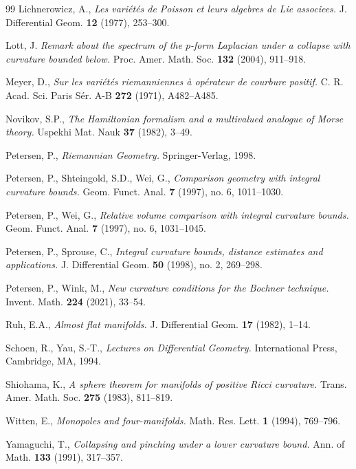 \documentclass[12pt, twoside]{article}
\theoremstyle{definition}
\numberwithin{equation}{section}
\begin{document}
\begin{thebibliography}{99}
		Lichnerowicz, A., \emph{Les variétés de Poisson et leurs algebres de Lie associees.} J. Differential Geom. \textbf{12} (1977), 253--300.
		
		Lott, J. \emph{Remark about the spectrum of the $p$-form Laplacian under a collapse with curvature bounded below.} Proc. Amer. Math. Soc. \textbf{132} (2004), 911--918.
		
		Meyer, D., \emph{Sur les variétés riemanniennes à opérateur de courbure positif.} C. R. Acad. Sci. Paris Sér. A-B \textbf{272} (1971), A482--A485.
		
		 Novikov, S.P., \emph{The Hamiltonian formalism and a multivalued analogue of Morse theory.} Uspekhi Mat. Nauk \textbf{37} (1982), 3--49.
		
		Petersen, P., \emph{Riemannian Geometry.} Springer-Verlag, 1998.
		
		Petersen, P., Shteingold, S.D.,  Wei, G.,  \emph{Comparison geometry with integral curvature bounds.} Geom. Funct. Anal. \textbf{7} (1997), no. 6, 1011--1030.
		
		Petersen, P., Wei, G., \emph{Relative volume comparison with integral curvature bounds.} Geom. Funct. Anal. \textbf{7} (1997), no. 6, 1031--1045.
		
	Petersen, P., Sprouse, C., \emph{Integral curvature bounds, distance estimates and applications.} J. Differential Geom. \textbf{50} (1998), no. 2, 269--298.
		
		Petersen, P., Wink, M.,  \emph{New curvature conditions for the Bochner technique.} Invent. Math. \textbf{224} (2021), 33--54.
		
		Ruh, E.A.,  \emph{Almost flat manifolds.} J. Differential Geom. \textbf{17} (1982), 1--14.
		
		Schoen, R., Yau, S.-T.,  \emph{Lectures on Differential Geometry.} International Press, Cambridge, MA, 1994.
		
		Shiohama, K., \emph{A sphere theorem for manifolds of positive Ricci curvature.} Trans. Amer. Math. Soc. \textbf{275} (1983), 811--819.
		
		Witten, E., \emph{Monopoles and four-manifolds.} Math. Res. Lett. \textbf{1} (1994), 769--796.
		
		Yamaguchi, T., \emph{Collapsing and pinching under a lower curvature bound.} Ann. of Math. \textbf{133} (1991), 317--357.
		

\end{thebibliography}
\end{document}
